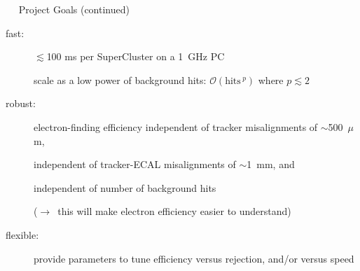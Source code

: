 \documentclass[landscape]{article}
\newenvironment{slide}[1][ ]{\mbox{\bf #1 } \vfill}{\vfill \mbox{ } \hfill \Large \arabic{page} \pagebreak}
\begin{document}
\begin{slide}
Project Goals (continued)

\vspace{1 cm}
\begin{description}

\item[fast:] $\lesssim$100 ms per SuperCluster on a 1~GHz PC

scale as a low power of background hits: $\mathcal{O}(\mbox{hits}\,^p)$ where $p \lesssim 2$

\vspace{1 cm}

\item[robust:] electron-finding efficiency independent of tracker misalignments of $\sim$500~$\mu$m,

independent of tracker-ECAL misalignments of $\sim$1~mm, and

independent of number of background hits

($\rightarrow$~this will make electron efficiency easier to understand)

\vspace{1 cm}

\item[flexible:] provide parameters to tune efficiency versus rejection, and/or versus speed

\end{description}
\end{slide}
\end{document}
